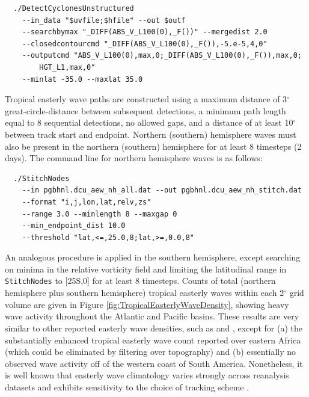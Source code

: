 \documentclass[gmdd, hvmath, online]{copernicus_discussions}
\begin{document}
{\small \begin{verbatim}
  ./DetectCyclonesUnstructured
    --in_data "$uvfile;$hfile" --out $outf
    --searchbymax "_DIFF(ABS_V_L100(0),_F())" --mergedist 2.0
    --closedcontourcmd "_DIFF(ABS_V_L100(0),_F()),-5.e-5,4,0"
    --outputcmd "ABS_V_L100(0),max,0;_DIFF(ABS_V_L100(0),_F()),max,0;
        HGT_L1,max,0"
    --minlat -35.0 --maxlat 35.0 
\end{verbatim}}

Tropical easterly wave paths are constructed using a maximum distance of 3$^\circ$ great-circle-distance between subsequent detections, a minimum path length equal to 8 sequential detections, no allowed gaps, and a distance of at least 10$^\circ$ between track start and endpoint.  Northern (southern) hemisphere waves must also be present in the northern (southern) hemisphere for at least 8 timesteps (2 days).  The command line for northern hemisphere waves is as follows:

{\small \begin{verbatim}
  ./StitchNodes
    --in pgbhnl.dcu_aew_nh_all.dat --out pgbhnl.dcu_aew_nh_stitch.dat
    --format "i,j,lon,lat,relv,zs"
    --range 3.0 --minlength 8 --maxgap 0
    --min_endpoint_dist 10.0
    --threshold "lat,<=,25.0,8;lat,>=,0.0,8"
\end{verbatim}}

An analogous procedure is applied in the southern hemisphere, except searching on minima in the relative vorticity field and limiting the latitudinal range in \texttt{StitchNodes} to [25S,0] for at least 8 timesteps.  Counts of total (northern hemisphere plus southern hemisphere) tropical easterly waves within each 2$^\circ$ grid volume are given in Figure \ref{fig:TropicalEasterlyWaveDensity}, showing heavy wave activity throughout the Atlantic and Pacific basins.  These results are very similar to other reported easterly wave densities, such as \cite{belanger2014african} and \cite{thorncroft2001african}, except for (a) the substantially enhanced tropical easterly wave count reported over eastern Africa (which could be eliminated by filtering over topography) and (b) essentially no observed wave activity off of the western coast of South America.  Nonetheless, it is well known that easterly wave climatology varies strongly across reanalysis datasets and exhibits sensitivity to the choice of tracking scheme \citep{hodges2003comparison}.

\end{document}
